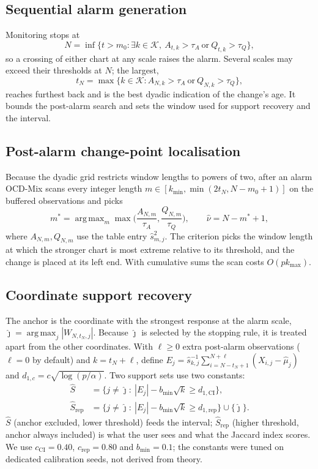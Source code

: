 \documentclass[conference]{IEEEtran}
\newcommand{\hs}{\hat{s}}
\DeclareMathOperator*{\argmax}{arg\,max}
\begin{document}
\subsection{Sequential alarm generation}
Monitoring stops at
\begin{equation}
N=\inf\{t>m_0:\exists k\in\mathcal{K},\ A_{t,k}>\tau_A\ \text{or}\ Q_{t,k}>\tau_Q\}, \label{eq:N}
\end{equation}
so a crossing of either chart at any scale raises the alarm. Several scales may exceed their thresholds at $N$; the largest,
\begin{equation}
t_N=\max\{k\in\mathcal{K}:A_{N,k}>\tau_A\ \text{or}\ Q_{N,k}>\tau_Q\}, \label{eq:tN}
\end{equation}
reaches furthest back and is the best dyadic indication of the change's age. It bounds the post-alarm search and sets the window used for support recovery and the interval.

\subsection{Post-alarm change-point localisation}
Because the dyadic grid restricts window lengths to powers of two, after an alarm OCD-Mix scans every integer length $m\in[k_{\min},\min(2t_N,N-m_0+1)]$ on the buffered observations and picks
\begin{equation}
m^*=\argmax_m\max\Big(\frac{A_{N,m}}{\tau_A},\frac{Q_{N,m}}{\tau_Q}\Big),\qquad \hat\nu=N-m^*+1, \label{eq:mstar}
\end{equation}
where $A_{N,m},Q_{N,m}$ use the table entry $\hs^2_{m,j}$. The criterion picks the window length at which the stronger chart is most extreme relative to its threshold, and the change is placed at its left end. With cumulative sums the scan costs $O(pk_{\max})$.

\subsection{Coordinate support recovery}\label{sec:support}
The anchor is the coordinate with the strongest response at the alarm scale, $\hat\jmath=\argmax_{j}|W_{N,t_N,j}|$. Because $\hat\jmath$ is selected by the stopping rule, it is treated apart from the other coordinates. With $\ell\ge 0$ extra post-alarm observations ($\ell=0$ by default) and $k=t_N+\ell$, define $E_j=\hs_{k,j}^{-1}\sum_{i=N-t_N+1}^{N+\ell}(X_{i,j}-\hat\mu_j)$ and $d_{1,c}=c\sqrt{\log(p/\alpha)}$. Two support sets use two constants:
\begin{align}
\hat S&=\{j\neq\hat\jmath:\ |E_j|-b_{\min}\sqrt{k}\ge d_{1,\mathrm{CI}}\}, \label{eq:S}\\
\hat S_{\mathrm{rep}}&=\{j\neq\hat\jmath:\ |E_j|-b_{\min}\sqrt{k}\ge d_{1,\mathrm{rep}}\}\cup\{\hat\jmath\}. \label{eq:Srep}
\end{align}
$\hat S$ (anchor excluded, lower threshold) feeds the interval; $\hat S_{\mathrm{rep}}$ (higher threshold, anchor always included) is what the user sees and what the Jaccard index scores. We use $c_{\mathrm{CI}}=0.40$, $c_{\mathrm{rep}}=0.80$ and $b_{\min}=0.1$; the constants were tuned on dedicated calibration seeds, not derived from theory.
\end{document}
